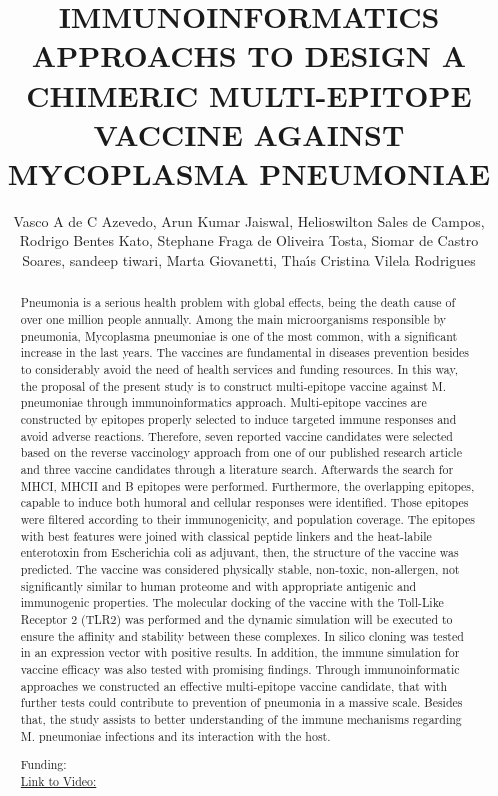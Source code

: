 \documentclass[twoside]{article}
\title{\vspace{-15mm}\fontsize{24pt}{10pt}\selectfont\textbf{ IMMUNOINFORMATICS APPROACHS TO DESIGN A CHIMERIC MULTI-EPITOPE VACCINE AGAINST MYCOPLASMA PNEUMONIAE }} %
\author{ Vasco A de C Azevedo,  Arun Kumar Jaiswal,  Helioswilton Sales de Campos,  Rodrigo Bentes Kato,  Stephane Fraga de Oliveira Tosta,  Siomar de Castro Soares,  sandeep tiwari,  Marta Giovanetti,  Tha\'{\i}s Cristina Vilela Rodrigues }
\affil{ UFMG - UNIVERSIDADE FEDERAL DE MINAS GERAIS/ UP- Universidade do Porto,  UNIVERSIDADE FEDERAL DE MINAS GERAIS,  INAPG- Fran\c{c}a }
\date{}
\begin{document}
  
  
  \maketitle %
  
  
  \thispagestyle{fancy} %
  
  
  \begin{abstract}
  Pneumonia is a serious health problem with global effects,  being the death cause of over one million people annually. Among the main microorganisms responsible by pneumonia,  Mycoplasma pneumoniae is one of the most common,  with a significant increase in the last years. The vaccines are fundamental in diseases prevention besides to considerably avoid the need of health services and funding resources. In this way,  the proposal of the present study is to construct multi-epitope vaccine against M. pneumoniae through immunoinformatics approach. Multi-epitope vaccines are constructed by epitopes properly selected to induce targeted immune responses and avoid adverse reactions. Therefore,  seven reported vaccine candidates were selected based on the reverse vaccinology approach from one of our published research article and three vaccine candidates through a literature search. Afterwards the search for MHCI,  MHCII and B epitopes were performed. Furthermore,  the overlapping epitopes,  capable to induce both humoral and cellular responses were identified. Those epitopes were filtered according to their immunogenicity,  and population coverage. The epitopes with best features were joined with classical peptide linkers and the heat-labile enterotoxin from Escherichia coli as adjuvant,  then,  the structure of the vaccine was predicted. The vaccine was considered physically stable,  non-toxic,  non-allergen,  not significantly similar to human proteome and with appropriate antigenic and immunogenic properties. The molecular docking of the vaccine with the Toll-Like Receptor 2 (TLR2) was performed and the dynamic simulation will be executed to ensure the affinity and stability between these complexes. In silico cloning was tested in an expression vector with positive results. In addition,  the immune simulation for vaccine efficacy was also tested with promising findings. Through immunoinformatic approaches we constructed an effective multi-epitope vaccine candidate,  that with further tests could contribute to prevention of pneumonia in a massive scale. Besides that,  the study assists to better understanding of the immune mechanisms regarding M. pneumoniae infections and its interaction with the host.
  
  Funding:   \\
  \href{http://ab3c.org.br/xpress_pres2020/xmxp2020-302914.html}{Link to Video:}

  \end{abstract}
   
  
\end{document}
